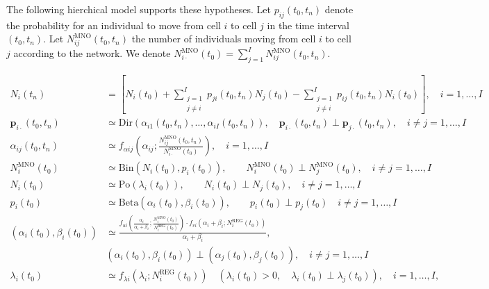 \documentclass[12pt, a4paper]{article}
\begin{document}
The following hierchical model supports these hypotheses. Let $p_{ij}(t_{0}, t_{n})$ denote the probability 
for an individual to move from cell $i$ to cell $j$ in the time interval $(t_{0}, t_{n})$. Let $N_{ij}^{\textrm{MNO}}(t_{0}, t_{n})$ the 
number of individuals moving from cell $i$ to cell $j$ according to the network. We denote $N_{i\cdot}^{\textrm{MNO}}(t_{0})=\sum_{j=1}^{I}N_{ij}^{\textrm{MNO}}(t_{0}, t_{n})$. 

\begin{subequations}
	\begin{align}
	\label{eq:Model2Ini}N_{i}(t_{n}) & = \left[ N_{i}(t_{0}) + \sum_{\substack{j=1\\j\neq i}}^{I}p_{ji}(t_{0}, t_{n})N_{j}(t_{0})-\sum_{\substack{j=1\\j\neq i}}^{I}p_{ij}(t_{0}, t_{n}) N_{i}(t_{0})\right ],\quad i=1,\dots,I\\ 
	\label{eq:Model2Mid}\mathbf{p}_{i\cdot}(t_{0}, t_{n})& \simeq\textrm{Dir}\left(\alpha_{i1}(t_{0}, t_{n}), \dots, \alpha_{iI}(t_{0}, t_{n})\right),\quad \mathbf{p}_{i\cdot}(t_{0}, t_{n})\perp\mathbf{p}_{j\cdot}(t_{0}, t_{n}),\quad i\neq j=1,\dots,I\\
	\label{eq:Model2Fin}\alpha_{ij}(t_{0}, t_{n})&\simeq f_{\alpha ij}\left(\alpha_{ij}; \frac{N_{ij}^{\textrm{MNO}}(t_{0}, t_{n})}{N_{i\cdot}^{\textrm{MNO}}(t_{0})}\right), \quad i=1,\dots,I\\
	\label{eq:Model1Ini}N_{i}^{\textrm{MNO}}(t_{0})&\simeq\textrm{Bin}\left(N_{i}(t_{0}), p_{i}(t_{0})\right),\qquad N_{i}^{\textrm{MNO}}(t_{0})\perp N_{j}^{\textrm{MNO}}(t_{0}),\quad i\neq j=1,\dots,I\\
	N_{i}(t_{0})&\simeq\textrm{Po}\left(\lambda_{i}(t_{0})\right),\qquad N_{i}(t_{0})\perp N_{j}(t_{0}),\quad i\neq j=1,\dots,I\\
	p_{i}(t_{0})&\simeq\textrm{Beta}\left(\alpha_{i}(t_{0}),\beta_{i}(t_{0})\right),\qquad p_{i}(t_{0})\perp p_{j}(t_{0})\quad i\neq j=1,\dots,I\\
	\left(\alpha_{i}(t_{0}), \beta_{i}(t_{0})\right)&\simeq \frac{f_{ui}\left(\frac{\alpha_{i}}{\alpha_{i}+\beta_{i}}; \frac{N_{i}^{\textrm{MNO}}(t_{0})}{N_{i}^{\textrm{REG}}(t_{0})}\right)\cdot f_{vi}\left(\alpha_{i}+\beta_{i}; N_{i}^{\textrm{REG}}(t_{0})\right)}{\alpha_{i}+\beta_{i}},\nonumber \\ &(\alpha_{i}(t_{0}),\beta_{i}(t_{0}))\perp(\alpha_{j}(t_{0}),\beta_{j}(t_{0})),\quad i\neq j=1,\dots,I\\
	\label{eq:Model1Fin}\lambda_{i}(t_{0})&\simeq f_{\lambda i}(\lambda_{i}; N_{i}^{\textrm{REG}}(t_{0}))\quad (\lambda_{i}(t_{0}) > 0,\quad \lambda_{i}(t_{0})\perp\lambda_{j}(t_{0})), \quad i=1,\dots,I,
	\end{align}
\end{subequations}
\end{document}
